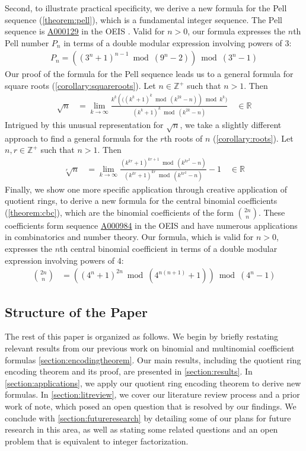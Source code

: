 \documentclass[11pt,reqno]{article}
\theoremstyle{plain}
\theoremstyle{definition}
\newcommand{\seqnum}[1]{\href{https://oeis.org/#1}{\rm \underline{#1}}}
\begin{document}
Second, to illustrate practical specificity, we derive a new formula for the Pell sequence (\cref{theorem:pell}), which is a fundamental integer sequence. The Pell sequence is \seqnum{A000129} in the OEIS \cite{A000129}. Valid for $n > 0$, our formula expresses the $n$th Pell number $P_n$ in terms of a double modular expression involving powers of $3$:
\begin{align*}
    P_n = \left((3^{n}+1)^{n-1} \bmod{(9^n-2)}\right) \bmod{(3^n-1)}
\end{align*}
Our proof of the formula for the Pell sequence leads us to a general formula for square roots (\cref{corollary:squareroots}). Let $n \in \mathbb{Z}^+$ such that $n > 1$. Then
\begin{align*}
\sqrt{n} &= \lim_{k\rightarrow\infty}
    \frac{k^k \left(((k^k + 1)^k \bmod{(k^{2k}-n)}\right) \bmod{k^k})}
        {(k^k + 1)^k \bmod{(k^{2k}-n)}} \quad \in \mathbb{R}
\end{align*}
Intrigued by this unusual representation for $\sqrt{n}$, we take a slightly different approach to find a general formula for the $r$th roots of $n$ (\cref{corollary:roots}). Let $n,r \in \mathbb{Z}^+$ such that $n > 1$. Then
\begin{align*}
\sqrt[r]{n} &= \lim_{k\rightarrow\infty}
    \frac{(k^{kr} + 1)^{kr+1} \bmod{(k^{kr^2}-n)}}
    {(k^{kr} + 1)^{kr} \bmod{ (k^{kr^2}-n)}} - 1  \quad \in \mathbb{R}
\end{align*}
Finally, we show one more specific application through creative application of quotient rings, to derive a new formula for the central binomial coefficients (\cref{theorem:cbc}), which are the binomial coefficients of the form $\binom{2n}{n}$. These coefficients form sequence \seqnum{A000984} in the OEIS \cite{A000984} and have numerous applications in combinatorics and number theory. Our formula, which is valid for $n > 0$, expresses the $n$th central binomial coefficient in terms of a double modular expression involving powers of $4$:
\begin{align*}
    \binom{2n}{n} &= \left((4^n + 1)^{2n} \bmod{(4^{n(n+1)} + 1)}\right) \bmod{(4^n-1)}
\end{align*}

\subsection{Structure of the Paper}
The rest of this paper is organized as follows. We begin by briefly restating relevant results from our previous work on binomial and multinomial coefficient formulas \cref{section:encodingtheorem}. Our main results, including the quotient ring encoding theorem and its proof, are presented in \cref{section:results}. In \cref{section:applications}, we apply our quotient ring encoding theorem to derive new formulas. In \cref{section:litreview}, we cover our literature review process and a prior work of note, which posed an open question that is resolved by our findings. We conclude with \cref{section:futureresearch} by detailing some of our plans for future research in this area, as well as stating some related questions and an open problem that is equivalent to integer factorization.
\end{document}
